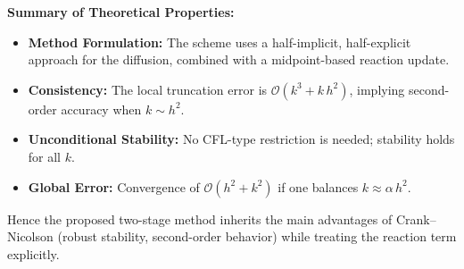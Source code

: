 \medskip
\noindent
\textbf{Summary of Theoretical Properties:}
\begin{itemize}
    \item \textbf{Method Formulation:} The scheme uses a half-implicit, half-explicit approach
          for the diffusion, combined with a midpoint-based reaction update.
    \item \textbf{Consistency:} The local truncation error is \(\mathcal{O}(k^3 + k\,h^2)\),
          implying second-order accuracy when \(k \sim h^2\).
    \item \textbf{Unconditional Stability:} No CFL-type restriction is needed; stability
          holds for all \(k\).
    \item \textbf{Global Error:} Convergence of \(\mathcal{O}(h^2 + k^2)\) if one balances
          \(k \approx \alpha\,h^2\).
\end{itemize}

Hence the proposed two-stage method inherits the main advantages of Crank–Nicolson
(robust stability, second-order behavior) while treating the reaction term explicitly.
